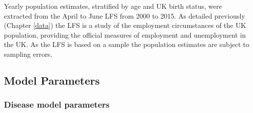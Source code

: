 \documentclass[11pt,twoside]{bristolthesis}
\begin{document}
  Yearly population estimates, stratified by age and UK birth status, were extracted from the April to June LFS from 2000 to 2015. As detailed previously (Chapter \ref{data}) the LFS is a study of the employment circumstances of the UK population, providing the official measures of employment and unemployment in the UK. As the LFS is based on a sample the population estimates are subject to sampling errors.
  
  \hypertarget{model-parameters}{%
  \subsection{Model Parameters}\label{model-parameters}}
  
  \hypertarget{disease-model-parameters}{%
  \subsubsection{Disease model parameters}\label{disease-model-parameters}}
  
\end{document}
